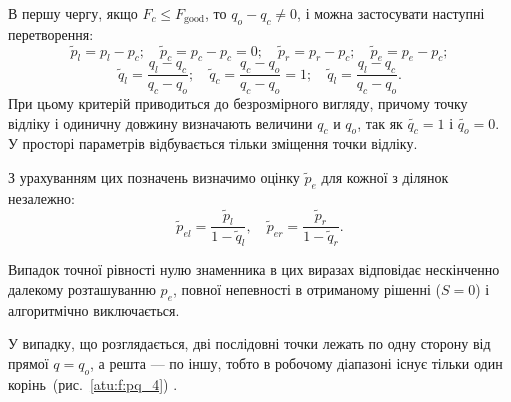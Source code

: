 \documentclass[a4paper,13pt]{atuaref}
\begin{document}
В першу чергу, якщо
$F_c \le F_\mathrm{good}$, то $q_o -q_c \ne 0$,
і можна застосувати наступні перетворення:
%
\[
  \tilde{p}_l = p_l - p_c;
  \quad
  \tilde{p}_c = p_c - p_c = 0;
  \quad
  \tilde{p}_r = p_r - p_c;
  \quad
  \tilde{p}_e = p_e - p_c;
\]
\begin{equation}
  \tilde{q}_l = \frac{q_l-q_c}{q_c-q_o};
  \quad
  \tilde{q}_c = \frac{q_c-q_o}{q_c-q_o} = 1;
  \quad
  \tilde{q}_l = \frac{q_l-q_c}{q_c-q_o}.
  \label{atu:eq:q_agent_rel}
\end{equation}
%
При цьому критерій приводиться до безрозмірного вигляду, причому точку відліку і одиничну довжину визначають величини
$q_c$ и $q_o$, так як $\tilde{q_c} = 1$ і $\tilde{q_o} = 0$.
У просторі параметрів відбувається тільки зміщення точки відліку.

З урахуванням цих позначень визначимо оцінку
$\tilde{p}_e$
для кожної з ділянок незалежно:
%
\begin{equation}
  \tilde{p}_{el} = \frac{\tilde{p}_l}{1-\tilde{q}_l},
  \quad
  \tilde{p}_{er} = \frac{\tilde{p}_r}{1-\tilde{q}_r}.
  \label{atu:eq:pr_ex}
\end{equation}

Випадок точної рівності нулю знаменника в цих виразах відповідає нескінченно
далекому розташуванню $p_e$, повної непевності в отриманому рішенні ($S = 0$)
і алгоритмічно виключається.

У випадку, що розглядається, дві послідовні точки лежать по одну сторону від прямої
$q = q_o$, а решта --- по іншу, тобто в робочому діапазоні існує тільки один
корінь~(рис.~\ref{atu:f:pq_4}) .
\end{document}
